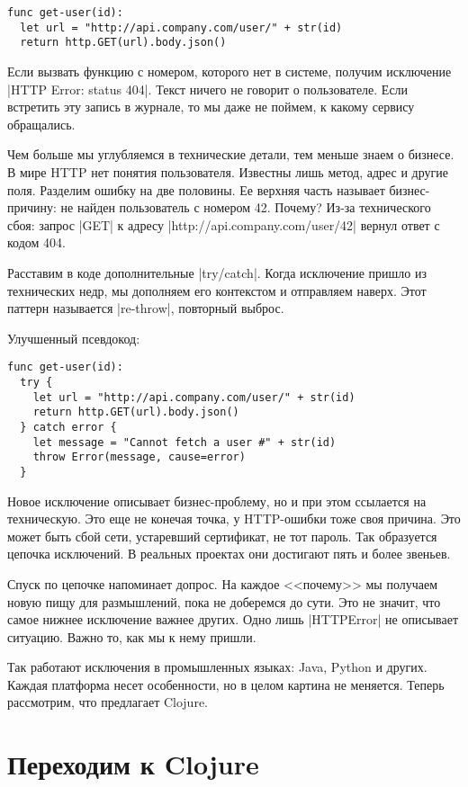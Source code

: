 \begin{verbatim}
func get-user(id):
  let url = "http://api.company.com/user/" + str(id)
  return http.GET(url).body.json()
\end{verbatim}

Если вызвать функцию с номером, которого нет в системе, получим исключение
\spverb|HTTP Error: status 404|. Текст ничего не говорит о пользователе. Если
встретить эту запись в журнале, то мы даже не поймем, к какому сервису
обращались.

Чем больше мы углубляемся в технические детали, тем меньше знаем о бизнесе. В
мире HTTP нет понятия пользователя. Известны лишь метод, адрес и другие
поля. Разделим ошибку на две половины. Ее верхняя часть называет бизнес-причину:
не найден пользователь с номером 42. Почему? Из-за технического сбоя: запрос
\spverb|GET| к адресу \spverb|http://api.company.com/user/42| вернул ответ с
кодом 404.

Расставим в коде дополнительные \spverb|try/catch|. Когда исключение пришло из
технических недр, мы дополняем его контекстом и отправляем наверх. Этот паттерн
называется \spverb|re-throw|, повторный выброс.

Улучшенный псевдокод:

\begin{verbatim}
func get-user(id):
  try {
    let url = "http://api.company.com/user/" + str(id)
    return http.GET(url).body.json()
  } catch error {
    let message = "Cannot fetch a user #" + str(id)
    throw Error(message, cause=error)
  }
\end{verbatim}

Новое исключение описывает бизнес-проблему, но и при этом ссылается на
техническую. Это еще не конечая точка, у HTTP-ошибки тоже своя причина. Это
может быть сбой сети, устаревший сертификат, не тот пароль. Так образуется
цепочка исключений. В реальных проектах они достигают пять и более звеньев.

Спуск по цепочке напоминает допрос. На каждое <<почему>> мы получаем новую пищу
для размышлений, пока не доберемся до сути. Это не значит, что самое нижнее
исключение важнее других. Одно лишь \spverb|HTTPError| не описывает
ситуацию. Важно то, как мы к нему пришли.

Так работают исключения в промышленных языках: Java, Python и других. Каждая
платформа несет особенности, но в целом картина не меняется. Теперь рассмотрим,
что предлагает Clojure.

\section{Переходим к Clojure}

